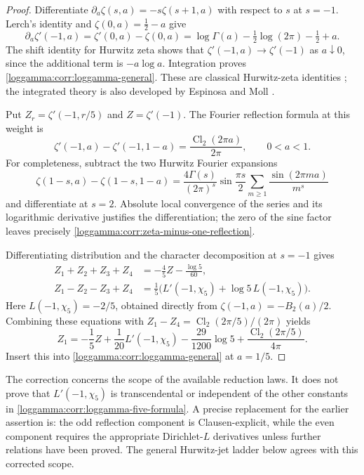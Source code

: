 \begin{proof}
Differentiate $\partial_a\zeta(s,a)=-s\zeta(s+1,a)$ with respect to
$s$ at $s=-1$.  Lerch's identity and $\zeta(0,a)=\tfrac12-a$ give
\[
 \partial_a\zeta'(-1,a)
 =\zeta'(0,a)-\zeta(0,a)
 =\log\Gamma(a)-\tfrac12\log(2\pi)-\tfrac12+a.
\]
The shift identity for Hurwitz zeta shows that
$\zeta'(-1,a)\to\zeta'(-1)$ as $a\downarrow0$, since the additional
term is $-a\log a$.  Integration proves
\eqref{loggamma:corr:loggamma-general}.  These are classical Hurwitz-zeta
identities \cite{hstruct:DLMF}; the integrated theory is also developed by
Espinosa and Moll \cite{loggamma:EspinosaMoll2002b}.

Put $Z_r=\zeta'(-1,r/5)$ and $Z=\zeta'(-1)$.  The Fourier reflection
formula at this weight is
\begin{equation}\label{loggamma:corr:zeta-minus-one-reflection}
 \zeta'(-1,a)-\zeta'(-1,1-a)
       =\frac{\operatorname{Cl}_2(2\pi a)}{2\pi},
       \qquad 0<a<1.
\end{equation}
For completeness, subtract the two Hurwitz Fourier expansions
\[
 \zeta(1-s,a)-\zeta(1-s,1-a)
 =\frac{4\Gamma(s)}{(2\pi)^s}\sin\frac{\pi s}{2}
       \sum_{m\geq1}\frac{\sin(2\pi ma)}{m^s}
\]
and differentiate at $s=2$.  Absolute local convergence of the
series and its logarithmic derivative justifies the differentiation;
the zero of the sine factor leaves precisely
\eqref{loggamma:corr:zeta-minus-one-reflection}.

Differentiating distribution and the character decomposition at $s=-1$
gives
\begin{align*}
 Z_1+Z_2+Z_3+Z_4&=-\frac45 Z-\frac{\log5}{60},\\
 Z_1-Z_2-Z_3+Z_4
   &=\frac15\bigl(L'(-1,\chi_5)+\log5\,L(-1,\chi_5)\bigr).
\end{align*}
Here $L(-1,\chi_5)=-2/5$, obtained directly from
$\zeta(-1,a)=-B_2(a)/2$.  Combining these equations with
$Z_1-Z_4=\operatorname{Cl}_2(2\pi/5)/(2\pi)$ yields
\[
 Z_1=-\frac15 Z+\frac1{20}L'(-1,\chi_5)
       -\frac{29}{1200}\log5
       +\frac{\operatorname{Cl}_2(2\pi/5)}{4\pi}.
\]
Insert this into \eqref{loggamma:corr:loggamma-general} at $a=1/5$.
\end{proof}

The correction concerns the scope of the available reduction laws.
It does not prove that $L'(-1,\chi_5)$ is transcendental or independent
of the other constants in \eqref{loggamma:corr:loggamma-five-formula}.  A precise
replacement for the earlier assertion is: the odd reflection component
is Clausen-explicit, while the even component requires the appropriate
Dirichlet-$L$ derivatives unless further relations have been proved.
The general Hurwitz-jet ladder below agrees with this corrected scope.
